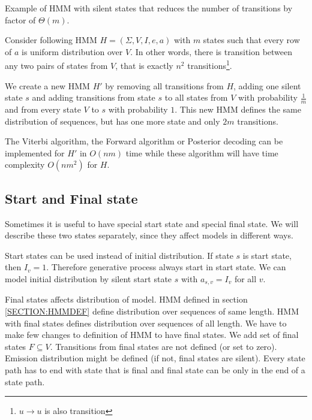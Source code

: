 \begin{example}
Example of HMM with silent states that reduces the number of transitions by factor
of $\Theta(m)$.

Consider following HMM $H=(\Sigma,V,I,e,a)$ with $m$ states such that every row
of $a$ is uniform distribution over $V$. In other words, there is transition
between any two pairs of states from $V$, that is exactly $n^2$
transitions\footnote{$u\to u$ is also transition}.

We create a new HMM $H'$ by removing all transitions from $H$, adding one silent
state $s$ and adding transitions
from state $s$ to all states from $V$ with probability $\frac1m$  and from every
state $V$ to $s$ with probability $1$. This new HMM
defines the same distribution of sequences, but has one more state and only $2m$
transitions. 

The Viterbi algorithm, the Forward algorithm or Posterior decoding can be
implemented for $H'$ in $O(nm)$ time while these algorithm will have time
complexity $O(nm^2)$ for $H$.
\end{example}



\subsection{Start and Final state}

Sometimes it is useful to have special start state and special final state. We
will describe these two states separately, since they affect models in different
ways. 

Start states can be used instead of initial distribution. If state $s$ is start
state, then $I_v=1$. Therefore generative process always start in start state.
We can model initial distribution by silent start state $s$ with $a_{s,v}=I_v$ for all $v$.

Final states affects distribution of model. HMM defined in section
\ref{SECTION:HMMDEF} define distribution over sequences of same length. HMM with
final states defines distribution over sequences of all length.  We have to make
few changes to definition of HMM to have final states.
We add set of final states $F\subseteq V$. Transitions from final states are not
defined (or set to zero). Emission distribution might be defined (if not, final
states are silent). Every state path has to end with state that is final and
final state can be only in the end of a state path.

